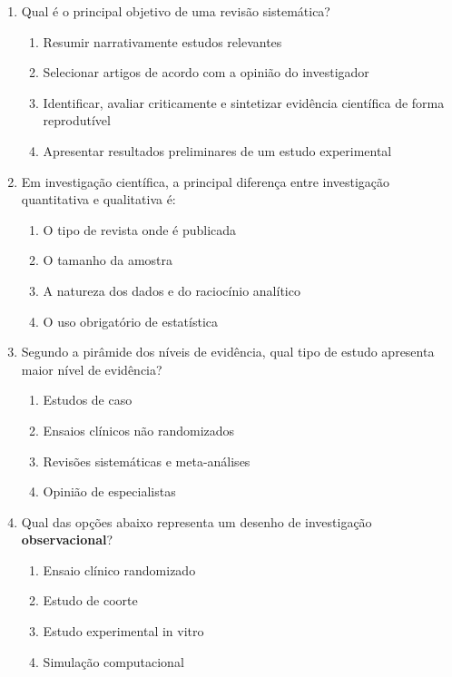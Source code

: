 \documentclass[12pt,a4paper]{article}
\begin{document}
\begin{enumerate}[label=\textbf{Q\arabic*.}]

\item Qual é o principal objetivo de uma revisão sistemática?
\begin{enumerate}[label=\alph*)]
\item Resumir narrativamente estudos relevantes  
\item Selecionar artigos de acordo com a opinião do investigador  
\item Identificar, avaliar criticamente e sintetizar evidência científica de forma reprodutível  
\item Apresentar resultados preliminares de um estudo experimental  
\end{enumerate}

\item Em investigação científica, a principal diferença entre investigação quantitativa e qualitativa é:
\begin{enumerate}[label=\alph*)]
\item O tipo de revista onde é publicada  
\item O tamanho da amostra  
\item A natureza dos dados e do raciocínio analítico  
\item O uso obrigatório de estatística  
\end{enumerate}

\item Segundo a pirâmide dos níveis de evidência, qual tipo de estudo apresenta maior nível de evidência?
\begin{enumerate}[label=\alph*)]
\item Estudos de caso  
\item Ensaios clínicos não randomizados  
\item Revisões sistemáticas e meta-análises  
\item Opinião de especialistas  
\end{enumerate}

\item Qual das opções abaixo representa um desenho de investigação \textbf{observacional}?
\begin{enumerate}[label=\alph*)]
\item Ensaio clínico randomizado  
\item Estudo de coorte  
\item Estudo experimental in vitro  
\item Simulação computacional  
\end{enumerate}


\end{enumerate}
\end{document}

